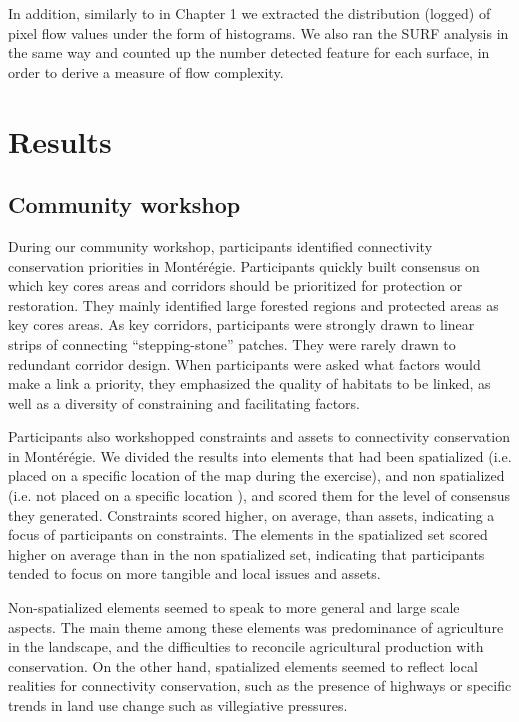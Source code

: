 In addition, similarly to in Chapter 1 we extracted the distribution (logged) of pixel flow values under the form of histograms. We also ran the SURF analysis in the same way and counted up the number detected feature for each surface, in order to derive a measure of flow complexity.\\

\section{Results}

\subsection{Community workshop}

During our community workshop, participants identified connectivity conservation priorities in Montérégie. Participants quickly built consensus on which key cores areas and corridors should be prioritized for protection or restoration. They mainly identified large forested regions and protected areas as key cores areas. As key corridors, participants were strongly drawn to linear strips of connecting “stepping-stone” patches. They were rarely drawn to redundant corridor design. When participants were asked what factors would make a link a priority, they emphasized the quality of habitats to be linked, as well as a diversity of constraining and facilitating factors.

Participants also workshopped constraints and assets to connectivity conservation in Montérégie. We divided the results into elements that had been spatialized (i.e. placed on a specific location of the map during the exercise), and non spatialized (i.e. not placed on a specific location ), and scored them for the level of consensus they generated. Constraints scored higher, on average, than assets, indicating a focus of participants on constraints. The elements in the spatialized set scored higher on average than in the non spatialized set, indicating that participants tended to focus on more tangible and local issues and assets.

Non-spatialized elements seemed to speak to more general and large scale aspects. The main theme among these elements was predominance of agriculture in the landscape, and the difficulties to reconcile agricultural production with conservation. On the other hand, spatialized elements seemed to reflect local realities for connectivity conservation, such as the presence of highways or specific trends in land use change such as villegiative pressures. \\

